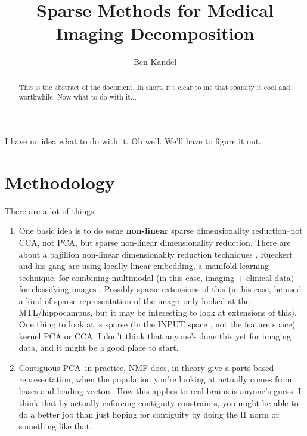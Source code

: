 \documentclass{nih}
\author{Ben Kandel}
\title{Sparse Methods for Medical Imaging Decomposition}
\begin{document}
\maketitle
\begin{abstract}
This is the abstract of the document.  In short, it's clear to me that sparsity is cool and worthwhile.  Now what to do with it...
\end{abstract}
I have no idea what to do with it. Oh well.  We'll have to figure it out. 

\section{Methodology}
There are a lot of things.  
\begin{enumerate}
\item One basic idea is to do some \textbf{non-linear} sparse dimensionality reduction--not CCA, not PCA, but sparse non-linear dimensionality reduction.  There are about a bajillion non-linear dimensionality reduction techniques \cite{van_der_maaten_dimensionality_2007}.  Rueckert and his gang are using locally linear embedding, a manifold learning technique, for combining multimodal (in this case, imaging + clinical data) for classifying images \cite{wolz_nonlinear_2012}.  Possibly sparse extensions of this (in his case, he used a kind of sparse representation of the image--only looked at the MTL/hippocampus, but it may be interesting to look at extensions of this).  One thing to look at is sparse (in the INPUT space \cite{scholkopf_input_1999}, not the feature space) kernel PCA or CCA.  I don't think that anyone's done this yet for imaging data, and it might be a good place to start. 
\item Contiguous PCA--in practice, NMF does, in theory \cite{donoho_when_2004} give a parts-based representation, when the population you're looking at actually comes from bases and loading vectors.  How this applies to real brains is anyone's guess.  I think that by actually enforcing contiguity constraints, you might be able to do a better job than just hoping for contiguity by doing the l1 norm or something like that. 

\end{enumerate}
\end{document}
